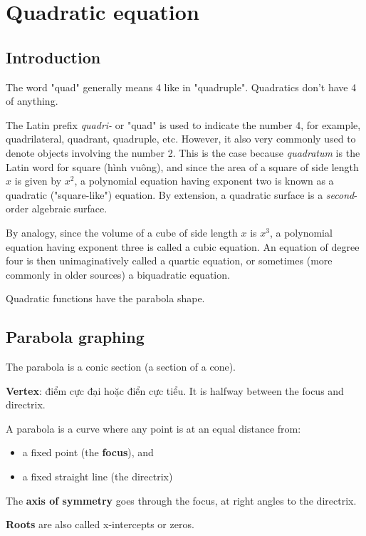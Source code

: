 \chapter{Quadratic equation}

\section{Introduction}

The word "quad" generally means 4 like in "quadruple". Quadratics don't have 4 of anything.

The Latin prefix \textit{quadri-} or "quad" is used to indicate the number 4, for example, quadrilateral, quadrant, quadruple, etc. However, it also very commonly used to denote objects involving the number 2. This is the case because \textit{quadratum} is the Latin word for square (hình vuông), and since the area of a square of side length $x$ is given by $x^2$, a polynomial equation having exponent two is known as a quadratic ("square-like") equation. By extension, a quadratic surface is a \textit{second}-order algebraic surface.

By analogy, since the volume of a cube of side length $x$ is $x^3$, a polynomial equation having exponent three is called a cubic equation. An equation of degree four is then unimaginatively called a quartic equation, or sometimes (more commonly in older sources) a biquadratic equation.

Quadratic functions have the parabola shape.


\section{Parabola graphing}

The parabola is a conic section (a section of a cone).

\textbf{Vertex}: điểm cực đại hoặc điển cực tiểu. It is halfway between the focus and directrix.

A parabola is a curve where any point is at an equal distance from:
\begin{itemize}
	\item a fixed point (the \textbf{focus}), and
    \item a fixed straight line (the directrix)
\end{itemize}

The \textbf{axis of symmetry} goes through the focus, at right angles to the directrix.

\textbf{Roots} are also called x-intercepts or zeros.